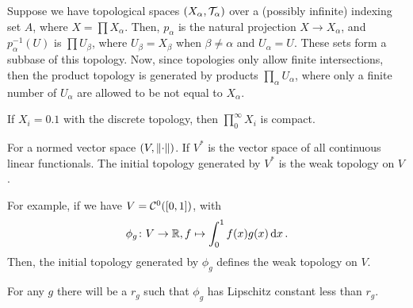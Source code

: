 \begin{definition}
    Suppose we have topological spaces $(X_\alpha, \mathcal T_\alpha)$ over a (possibly infinite) indexing set $A$, where $X = \prod X_\alpha$. Then, $p_\alpha$ is the natural projection $X \to X_\alpha$, and $p_\alpha^{-1}(U)$ is $\prod U_\beta$, where $U_\beta = X_\beta$ when $\beta \ne \alpha$ and $U_\alpha = U$. These sets form a subbase of this topology. Now, since topologies only allow finite intersections, then the product topology is generated by products $\prod_\alpha U_\alpha$, where only a finite number of $U_\alpha$ are allowed to be not equal to $X_\alpha$.
\end{definition}

\begin{example}
    If $X_i = \qty{0, 1}$ with the discrete topology, then $\prod_0^\infty X_i$ is compact.
\end{example}

\begin{definition}
    For a normed vector space $(V, \norm{\cdot})$. If $V^*$ is the vector space of all continuous linear functionals. The initial topology generated by $V^*$ is the weak topology on $V$.    
\end{definition}

\begin{example}
    For example, if we have $V = \mathcal C^0([0, 1])$, with \[\phi_g\colon V \to \mathbb R, f \mapsto \int_0^1 f(x)g(x) \dd{x}.\] Then, the initial topology generated by $\phi_g$ defines the weak topology on $V$.
\end{example}

For any $g$ there will be a $r_g$ such that $\phi_g$ has Lipschitz constant less than $r_g$.